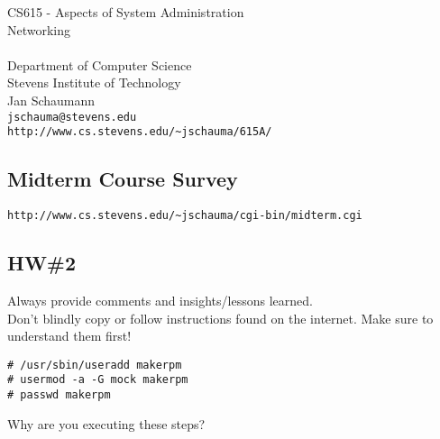 \documentclass[xga]{xdvislides}
\begin{document}
\setfontphv

\lhead{\slidetitle}                               %
\cfoot{\relax}                               %
\rfoot{\Gray{\today}}

\vspace*{\fill}
\begin{center}
	\Hugesize
		CS615 - Aspects of System Administration\\ [1em]
		Networking\\ [1em]
	\hspace*{5mm}\blueline\\ [1em]
	\Normalsize
		Department of Computer Science\\
		Stevens Institute of Technology\\
		Jan Schaumann\\
		\verb+jschauma@stevens.edu+\\
		\verb+http://www.cs.stevens.edu/~jschauma/615A/+
\end{center}
\vspace*{\fill}

\subsection{Midterm Course Survey}
\vspace{.5in}
\begin{center}
\verb+http://www.cs.stevens.edu/~jschauma/cgi-bin/midterm.cgi+
\end{center}

\subsection{HW\#2}
Always provide comments and insights/lessons learned.
\\

Don't blindly copy or follow instructions found on the internet.  Make
sure to understand them first!

\begin{verbatim}
# /usr/sbin/useradd makerpm
# usermod -a -G mock makerpm
# passwd makerpm
\end{verbatim}

Why are you executing these steps? \\
\end{document}
